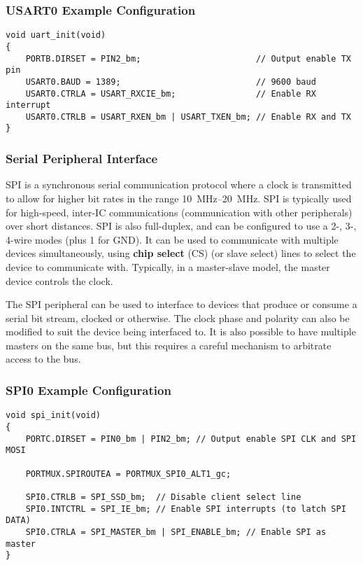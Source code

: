 \documentclass{article}
\begin{document}
\subsubsection{USART0 Example Configuration}
\begin{verbatim}
void uart_init(void)
{
    PORTB.DIRSET = PIN2_bm;                       // Output enable TX pin
    USART0.BAUD = 1389;                           // 9600 baud
    USART0.CTRLA = USART_RXCIE_bm;                // Enable RX interrupt
    USART0.CTRLB = USART_RXEN_bm | USART_TXEN_bm; // Enable RX and TX
}
\end{verbatim}
\subsubsection{Serial Peripheral Interface}
SPI is a synchronous serial communication protocol where a clock is
transmitted to allow for higher bit rates in the range
\qtyrange{10}{20}{MHz}. SPI is typically used for high-speed, inter-IC
communications (communication with other peripherals) over short
distances. SPI is also \linebreak full-duplex, and can be configured to
use a 2-, 3-, 4-wire modes (plus 1 for GND). It can be used to
communicate with multiple devices simultaneously, using \textbf{chip
select} (CS) (or slave select) lines to select the device to
communicate with. Typically, in a master-slave model, the master device
controls the clock.

The SPI peripheral can be used to interface to devices that produce or
consume a serial bit stream, clocked or otherwise. The clock phase and
polarity can also be modified to suit the device being interfaced to.
It is also possible to have multiple masters on the same bus, but this
requires a careful mechanism to arbitrate access to the bus.
\subsubsection{SPI0 Example Configuration}
\begin{verbatim}
void spi_init(void)
{
    PORTC.DIRSET = PIN0_bm | PIN2_bm; // Output enable SPI CLK and SPI MOSI

    PORTMUX.SPIROUTEA = PORTMUX_SPI0_ALT1_gc;

    SPI0.CTRLB = SPI_SSD_bm;  // Disable client select line
    SPI0.INTCTRL = SPI_IE_bm; // Enable SPI interrupts (to latch SPI DATA)
    SPI0.CTRLA = SPI_MASTER_bm | SPI_ENABLE_bm; // Enable SPI as master
}
\end{verbatim}
\end{document}
